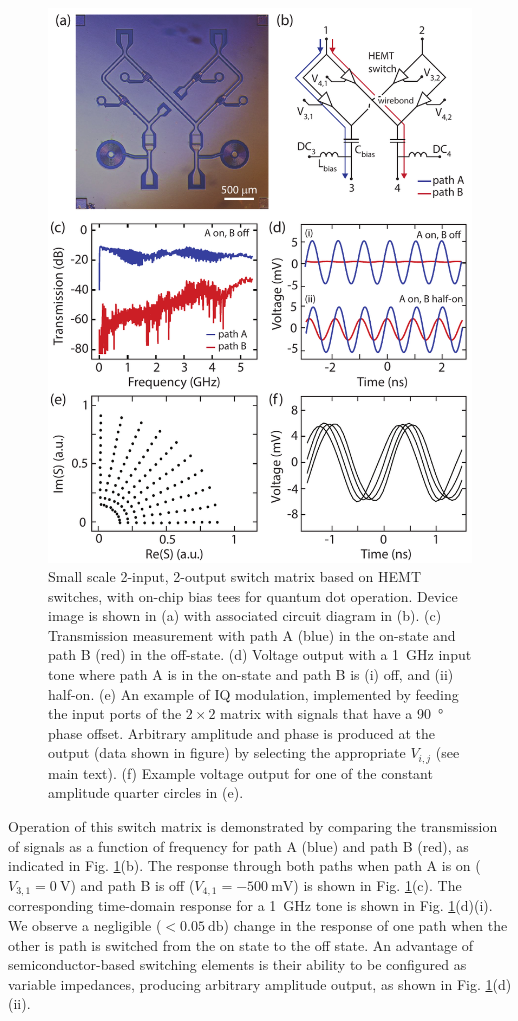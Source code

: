 \begin{figure}
\centering
\includegraphics[width=0.8\linewidth]{Fig4_arch}
\caption[Implementation of a $2\times2$ switch matrix]{\label{fig:diplexer}Small scale 2-input, 2-output switch matrix based on HEMT switches, with on-chip bias tees for quantum dot operation. Device image is shown in (a) with associated circuit diagram in (b). (c) Transmission measurement with path A (blue) in the on-state and path B (red) in the off-state. (d) Voltage output with a \SI{1}{\giga\hertz} input tone where path A is in the on-state and path B is (i) off, and (ii) half-on. (e) An example of IQ modulation, implemented by feeding the input ports of the $2\times2$ matrix with signals that have a \SI{90}{\degree} phase offset. Arbitrary amplitude and phase is produced at the output (data shown in figure) by selecting the appropriate $V_{i,j}$ (see main text). (f) Example voltage output for one of the constant amplitude quarter circles in (e).}
\end{figure}

Operation of this switch matrix is demonstrated by comparing the transmission of signals as a function of frequency for path A (blue) and path B (red), as indicated in Fig. \ref{fig:diplexer}(b). The response through both paths when path A is on ($V_{3,1}=\SI{0}{\volt}$) and path B is off ($V_{4,1} = \SI{-500}{\milli\volt}$) is shown in Fig. \ref{fig:diplexer}(c). The corresponding time-domain response for a \SI{1}{\giga\hertz} tone is shown in Fig. \ref{fig:diplexer}(d)(i). We observe a negligible ($< \SI{0.05}{\decibel}$) change in the response of one path when the other is path is switched from the on state to the off state. An advantage of semiconductor-based switching elements is their ability to be configured as variable impedances,  producing arbitrary amplitude output, as shown in Fig. \ref{fig:diplexer}(d)(ii).

